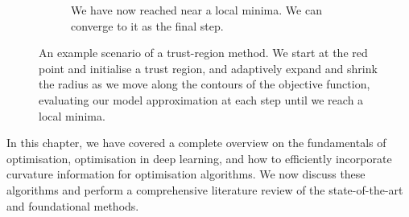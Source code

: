 \begin{figure}[H]
\begin{subfigure}[b]{0.33\linewidth}
        \caption{We have now reached near a local minima. We can converge to it as the final step.}
        \label{fig:tr_example_5}
    \end{subfigure}
    \caption{An example scenario of a trust-region method. We start at the red point and initialise a trust region, and adaptively expand and shrink the radius as we move along the contours of the objective function, evaluating our model approximation at each step until we reach a local minima.}
    \label{fig:tr_example}
\end{figure}

In this chapter, we have covered a complete overview on the fundamentals of optimisation, optimisation in deep learning, and how to efficiently incorporate curvature information for optimisation algorithms. We now discuss these algorithms and perform a comprehensive literature review of the state-of-the-art and foundational methods.